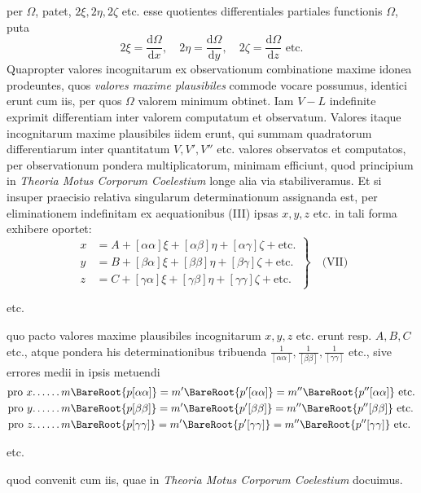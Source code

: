 per \(\Omega\), patet, \(2\xi,2\eta,2\zeta\) etc. esse quotientes differentiales partiales functionis \(\Omega\), puta
\[
2\xi=\frac{\mathrm{d}\Omega}{\mathrm{d}x},\quad2\eta=\frac{\mathrm{d}\Omega}{\mathrm{d}y},\quad2\zeta=\frac{\mathrm{d}\Omega}{\mathrm{d}z}\text{ etc.}
\]
Quapropter valores incognitarum ex observationum combinatione maxime idonea prodeuntes, quos \textit{valores maxime plausibiles} commode vocare possumus, identici erunt cum iis, per quos \(\Omega\) valorem minimum obtinet. Iam \(V-L\) indefinite exprimit differentiam inter valorem computatum et observatum. Valores itaque incognitarum maxime plausibiles iidem erunt, qui summam quadratorum differentiarum inter quantitatum \(V,V',V''\) etc. valores observatos et computatos, per observationum pondera multiplicatorum, minimam efficiunt, quod principium in \textit{Theoria Motus Corporum Coelestium} longe alia via stabiliveramus. Et si insuper praecisio relativa singularum determinationum assignanda est, per eliminationem indefinitam ex aequationibus (III) ipsas \(x,y,z\) etc. in tali forma exhibere oportet:
\[
\left.\begin{aligned}
x&=A+[\alpha\alpha]\xi+[\alpha\beta]\eta+[\alpha\gamma]\zeta+\text{etc.}\\
y&=B+[\beta\alpha]\xi+[\beta\beta]\eta+[\beta\gamma]\zeta+\text{etc.}\\
z&=C+[\gamma\alpha]\xi+[\gamma\beta]\eta+[\gamma\gamma]\zeta+\text{etc.}
\end{aligned}\right\}\quad\text{(VII)}
\]
\begin{center}etc.\end{center}
quo pacto valores maxime plausibiles incognitarum \(x,y,z\) etc. erunt resp. \(A,B,C\) etc., atque pondera his determinationibus tribuenda \(\frac1{[\alpha\alpha]},\frac1{[\beta\beta]},\frac1{[\gamma\gamma]}\) etc., sive errores medii in ipsis metuendi
\[
\begin{aligned}
\text{pro }x\mathord{.}\,\mathord{.}\,\mathord{.}\,\mathord{.}\,\mathord{.}\,\mathord{.}\,&m\BareRoot{p[\alpha\alpha]}=m'\BareRoot{p'[\alpha\alpha]}=m''\BareRoot{p''[\alpha\alpha]}\text{ etc.}\\
\text{pro }y\mathord{.}\,\mathord{.}\,\mathord{.}\,\mathord{.}\,\mathord{.}\,\mathord{.}\,&m\BareRoot{p[\beta\beta]}=m'\BareRoot{p'[\beta\beta]}=m''\BareRoot{p''[\beta\beta]}\text{ etc.}\\
\text{pro }z\mathord{.}\,\mathord{.}\,\mathord{.}\,\mathord{.}\,\mathord{.}\,\mathord{.}\,&m\BareRoot{p[\gamma\gamma]}=m'\BareRoot{p'[\gamma\gamma]}=m''\BareRoot{p''[\gamma\gamma]}\text{ etc.}
\end{aligned}
\]
\begin{center}etc.\end{center}
quod convenit cum iis, quae in \textit{Theoria Motus Corporum Coelestium} docuimus.

